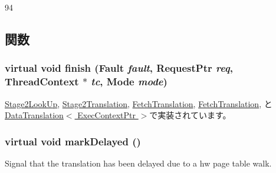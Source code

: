 \begin{DoxyCode}
94         {}
\end{DoxyCode}


\subsection{関数}
\hypertarget{classBaseTLB_1_1Translation_a5698e0a932f298729d10355d4384e565}{
\subsubsection[{finish}]{\setlength{\rightskip}{0pt plus 5cm}virtual void finish ({\bf Fault} {\em fault}, \/  {\bf RequestPtr} {\em req}, \/  {\bf ThreadContext} $\ast$ {\em tc}, \/  {\bf Mode} {\em mode})}}
\label{classBaseTLB_1_1Translation_a5698e0a932f298729d10355d4384e565}


\hyperlink{classArmISA_1_1Stage2LookUp_a01e7d945def8d2e5df87a169954fa89f}{Stage2LookUp}, \hyperlink{classArmISA_1_1Stage2MMU_1_1Stage2Translation_a01e7d945def8d2e5df87a169954fa89f}{Stage2Translation}, \hyperlink{classDefaultFetch_1_1FetchTranslation_a01e7d945def8d2e5df87a169954fa89f}{FetchTranslation}, \hyperlink{classTimingSimpleCPU_1_1FetchTranslation_a01e7d945def8d2e5df87a169954fa89f}{FetchTranslation}, と \hyperlink{classDataTranslation_a01e7d945def8d2e5df87a169954fa89f}{DataTranslation$<$ ExecContextPtr $>$}で実装されています。\hypertarget{classBaseTLB_1_1Translation_ab88d5e1938190b55d7859d5cc4d10446}{
\subsubsection[{markDelayed}]{\setlength{\rightskip}{0pt plus 5cm}virtual void markDelayed ()}}
\label{classBaseTLB_1_1Translation_ab88d5e1938190b55d7859d5cc4d10446}
Signal that the translation has been delayed due to a hw page table walk. 

